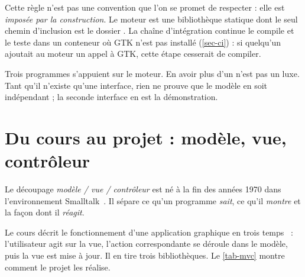 Cette règle n'est pas une convention que l'on se promet de respecter : elle est
\emph{imposée par la construction}. Le moteur est une bibliothèque statique dont le seul
chemin d'inclusion est le dossier . La chaîne d'intégration continue le
compile et le teste dans un conteneur où GTK n'est pas installé (\cref{sec-ci}) : si quelqu'un
ajoutait au moteur un appel à GTK, cette étape cesserait de compiler.

Trois programmes s'appuient sur le moteur. En avoir plus d'un n'est pas un luxe. Tant qu'il
n'existe qu'une interface, rien ne prouve que le modèle en soit indépendant ; la seconde
interface en est la démonstration.

\section{Du cours au projet : modèle, vue, contrôleur}

Le découpage \emph{modèle / vue / contrôleur} est né à la fin des années 1970 dans
l'environnement Smalltalk~\cite{reenskaug1979, krasner1988}. Il sépare ce qu'un programme
\emph{sait}, ce qu'il \emph{montre} et la façon dont il \emph{réagit}.

Le cours décrit le fonctionnement d'une application graphique en trois temps~\cite{toulouse2023} :
l'utilisateur agit sur la vue, l'action correspondante se déroule dans le modèle, puis la vue
est mise à jour. Il en tire trois bibliothèques. Le \cref{tab-mvc} montre comment le
projet les réalise.

